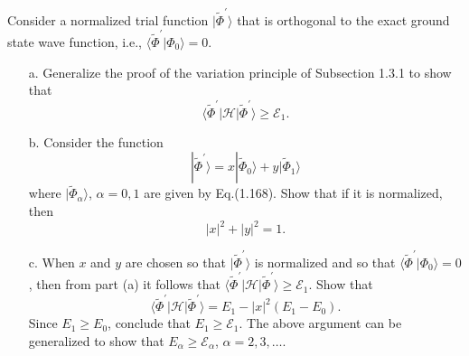 \documentclass[a4paper]{book}
\newcounter{exercise}[chapter]
\begin{document}
	\begin{exercise}
	Consider a normalized trial function $|\tilde{\Phi}^\prime \rangle$ that is orthogonal to the exact ground state wave function, i.e., $\langle \tilde{\Phi}^\prime | \Phi_0 \rangle = 0$.
	\begin{enumerate}
	
	\item[a.] Generalize the proof of the variation principle of Subsection 1.3.1 to show that
	\[
		\langle \tilde{\Phi}^\prime | \mathscr{H} | \tilde{\Phi}^\prime \rangle \geq \mathscr{E}_1.
	\]	

	\item[b.] Consider the function
	\[
		| \tilde{\Phi}^\prime \rangle = x | \tilde{\Phi}_0 \rangle + y | \tilde{\Phi}_1 \rangle
	\]
	where $| \tilde{\Phi}_\alpha \rangle$, $\alpha = 0, 1$ are given by Eq.(1.168). Show that if it is normalized, then
	\[
		|x|^2 + |y|^2 = 1.
	\]
	
	\item[c.] When $x$ and $y$ are chosen so that $| \tilde{\Phi}^\prime \rangle$ is normalized and so that $\langle \tilde{\Phi}^\prime | \Phi_0 \rangle = 0$, then from part (a) it follows that $\langle \tilde{\Phi}^\prime | \mathscr{H} | \tilde{\Phi}^\prime \rangle \geq \mathscr{E}_1$. Show that
	\[
		\langle \tilde{\Phi}^\prime | \mathscr{H} | \tilde{\Phi}^\prime \rangle = E_1 - |x|^2 ( E_1 - E_0 ).
	\]
	Since $E_1 \geq E_0$, conclude that $E_1 \geq \mathscr{E}_1$. The above argument can be generalized to show that $E_\alpha \geq \mathscr{E}_\alpha$, $\alpha=2,3,\ldots$.
	
	\end{enumerate}
	\end{exercise}
	
\end{document}
